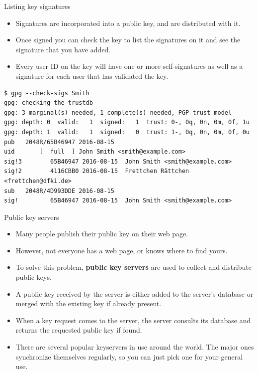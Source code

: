 \documentclass[
mode=present,
paper=smartboard,
size=20pt,
]{powerdot}
\newcommand\vsp{\vspace{-16mm}}
\begin{document}
\begin{slide}[method=direct]{Listing key signatures}
  \begin{itemize}
  \item Signatures are incorporated into a public key, and are
    distributed with it.
  \item Once signed you can check the key to list the signatures on it
    and see the signature that you have added.
  \item Every user ID on the key will have one or more self-signatures
    as well as a signature for each user that has validated the key.
  \end{itemize}
\vsp
\begin{verbatim}
$ gpg --check-sigs Smith
gpg: checking the trustdb
gpg: 3 marginal(s) needed, 1 complete(s) needed, PGP trust model
gpg: depth: 0  valid:   1  signed:   1  trust: 0-, 0q, 0n, 0m, 0f, 1u
gpg: depth: 1  valid:   1  signed:   0  trust: 1-, 0q, 0n, 0m, 0f, 0u
pub   2048R/65B46947 2016-08-15
uid       [  full  ] John Smith <smith@example.com>
sig!3        65B46947 2016-08-15  John Smith <smith@example.com>
sig!2        4116CBB0 2016-08-15  Frettchen Rättchen <frettchen@dfki.de>
sub   2048R/4D993DDE 2016-08-15
sig!         65B46947 2016-08-15  John Smith <smith@example.com>
\end{verbatim}
\end{slide}

\begin{slide}{Public key servers}
  \begin{itemize}
  \item Many people publish their public key on their web page.
  \item However, not everyone has a web page, or knows where to find
    yours.
  \item To solve this problem, \textbf{public key servers} are used to
    collect and distribute public keys.
  \item A public key received by the server is either added to the
    server's database or merged with the existing key if already
    present.
  \item When a key request comes to the server, the server consults
    its database and returns the requested public key if found.
  \item There are several popular keyservers in use around the world.
    The major ones synchronize themselves regularly, so you can just
    pick one for your general use.
  \end{itemize}
\end{slide}
\end{document}
